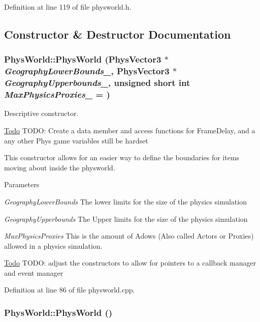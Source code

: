 Definition at line 119 of file physworld.h.

\subsection{Constructor \& Destructor Documentation}
\hypertarget{classPhysWorld_a3228c98369082139722d3c918d735e6c}{
\subsubsection[{PhysWorld}]{\setlength{\rightskip}{0pt plus 5cm}PhysWorld::PhysWorld ({\bf PhysVector3} $\ast$ {\em GeographyLowerBounds\_\-}, \/  {\bf PhysVector3} $\ast$ {\em GeographyUpperbounds\_\-}, \/  unsigned short int {\em MaxPhysicsProxies\_\-} = {})}}
\label{db/df5/classPhysWorld_a3228c98369082139722d3c918d735e6c}


Descriptive constructor. \begin{Desc}
\item[\hyperlink{todo__todo000013}{Todo}]TODO: Create a data member and access functions for FrameDelay, and a any other Phys game variables still be hardset \end{Desc}


This constructor allows for an easier way to define the boundaries for items moving about inside the physworld. 
\begin{DoxyParams}{Parameters}
\item[{\em GeographyLowerBounds}]The lower limits for the size of the physics simulation \item[{\em GeographyUpperbounds}]The Upper limits for the size of the physics simulation \item[{\em MaxPhysicsProxies}]This is the amount of Adows (Also called Actors or Proxies) allowed in a physics simulation.\end{DoxyParams}
\begin{Desc}
\item[\hyperlink{todo__todo000008}{Todo}]TODO: adjust the constructors to allow for pointers to a callback manager and event manager \end{Desc}


Definition at line 86 of file physworld.cpp.\hypertarget{classPhysWorld_a6ded8026b0cd72e7877830698197adf0}{
\subsubsection[{PhysWorld}]{\setlength{\rightskip}{0pt plus 5cm}PhysWorld::PhysWorld ()}}
\label{db/df5/classPhysWorld_a6ded8026b0cd72e7877830698197adf0}


